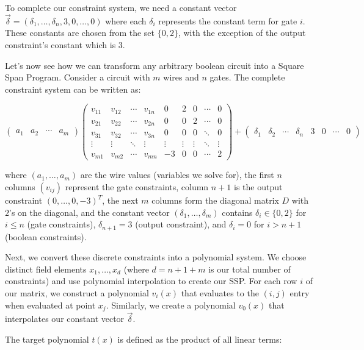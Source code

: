 To complete our constraint system, we need a constant vector $\vec{\delta} = (\delta_1,\ldots,\delta_n,3,0,\ldots,0)$ where each $\delta_i$ represents the constant term for gate $i$. These constants are chosen from the set $\{0,2\}$, with the exception of the output constraint's constant which is 3.

Let's now see how we can transform any arbitrary boolean circuit into a Square Span Program. Consider a circuit with $m$ wires and $n$ gates. The complete constraint system can be written as:

\[ \begin{pmatrix} a_1 & a_2 & \cdots & a_m \end{pmatrix}
\begin{pmatrix}
v_{11} & v_{12} & \cdots & v_{1n} & 0 & 2 & 0 & \cdots & 0 \\
v_{21} & v_{22} & \cdots & v_{2n} & 0 & 0 & 2 & \cdots & 0 \\
v_{31} & v_{32} & \cdots & v_{3n} & 0 & 0 & 0 & \ddots & 0 \\
\vdots & \vdots & \ddots & \vdots & \vdots & \vdots & \vdots & \ddots & \vdots \\
v_{m1} & v_{m2} & \cdots & v_{mn} & -3 & 0 & 0 & \cdots & 2
\end{pmatrix} + \begin{pmatrix} \delta_1 & \delta_2 & \cdots & \delta_n & 3 & 0 & \cdots & 0 \end{pmatrix} \]

where $(a_1,\ldots,a_m)$ are the wire values (variables we solve for), the first $n$ columns $(v_{ij})$ represent the gate constraints, column $n+1$ is the output constraint $(0,\ldots,0,-3)^T$, the next $m$ columns form the diagonal matrix $D$ with $2$'s on the diagonal, and the constant vector $(\delta_1,\ldots,\delta_m)$ contains $\delta_i \in \{0,2\}$ for $i \leq n$ (gate constraints), $\delta_{n+1} = 3$ (output constraint), and $\delta_i = 0$ for $i > n+1$ (boolean constraints).

Next, we convert these discrete constraints into a polynomial system. We choose distinct field elements $x_1,\ldots,x_d$ (where $d=n+1+m$ is our total number of constraints) and use polynomial interpolation to create our SSP. For each row $i$ of our matrix, we construct a polynomial $v_i(x)$ that evaluates to the $(i,j)$ entry when evaluated at point $x_j$. Similarly, we create a polynomial $v_0(x)$ that interpolates our constant vector $\vec{\delta}$.

The target polynomial $t(x)$ is defined as the product of all linear terms:

